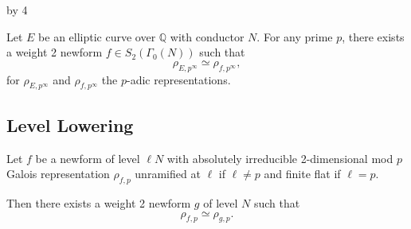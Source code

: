 \documentclass[12pt]{scrartcl}
\def\Q{{\mathbb Q}}
\def\anzspalten{4}
\newlength{\kastenwidth}
\newenvironment{kasten}{%
  \begin{lrbox}{\dummybox}%
    \begin{minipage}{0.96\linewidth}}%
    {\end{minipage}%
  \end{lrbox}%
  \raisebox{-\depth}{\psshadowbox[framesep=1em]{\usebox{\dummybox}}}\\[0.5em]}
\newenvironment{spalte}{%
  \setlength\kastenwidth{1.2\textwidth}
  \divide\kastenwidth by \anzspalten
  \begin{minipage}[t]{\kastenwidth}}{\end{minipage}\hfill}
\begin{document}
\begin{lrbox}{\spalten}
{\begin{spalte}
\begin{kasten}
Let $E$ be an elliptic curve over $\Q$ with conductor $N$.  For any prime $p$, there exists a weight 2 newform $f \in S_2(\Gamma_0(N))$ such that
\[ \rho_{E,p^{\infty}} \simeq \rho_{f,p^{\infty}},\]
for $\rho_{E,p^\infty}$ and $\rho_{f,p^\infty}$ the $p$-adic representations. 

\subsection*{\color{blue} Level Lowering}

Let $f$ be a newform of level $\ell N$ with absolutely irreducible 2-dimensional mod $p$ Galois representation $\rho_{f,p}$ unramified at $\ell$ if $\ell \neq p$ and finite flat if $\ell = p$. 

 Then there exists a weight 2 newform $g$ of level $N$ such that
 \vspace{-10pt}
\[ \rho_{f,p} \simeq \rho_{g,p}. \]

\end{kasten}












\end{spalte}}
\end{lrbox}
\end{document}
